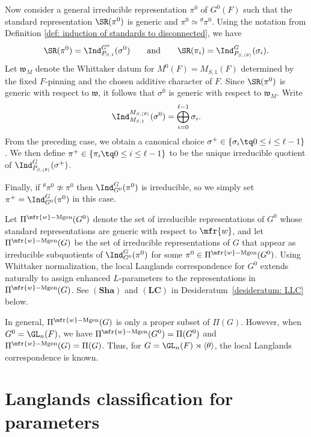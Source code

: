 \documentclass[11pt,letterpaper]{amsart}
\numberwithin{equation}{section}
\begin{document}
Now consider a general irreducible representation $\pi^0$ of $G^0(F)$ such that the standard representation $\SR(\pi^0)$ is generic and $\pi^0 \simeq {}^{\theta}\pi^0$. Using the notation from Definition \ref{def: induction of standards to disconnected}, we have
\[
\SR(\pi^0) = \Ind_{P_{{S},1}}^{G^0}(\sigma^0)
\qquad \text{and} \qquad
\SR(\pi_i) = \Ind_{P_{{S},\langle \theta\rangle}}^{G}(\sigma_i).
\]
 Let $\mathfrak{w}_M$ denote the Whittaker datum for $M^0(F) = M_{{S},1}(F)$ determined by the fixed $F$-pinning and the chosen additive character of $F$. Since $\SR(\pi^0)$ is generic with respect to $\mathfrak{w}$, it follows that $\sigma^0$ is generic with respect to $\mathfrak{w}_M$. Write 
\[\Ind_{M_{{S},1}}^{M_{{S}, \langle \theta \rangle}}(\sigma^0)= \bigoplus_{i=0}^{\ell -1} \sigma_{i}.\]
From the preceding case, we obtain a canonical choice $\sigma^+ \in \{\sigma_i \tq 0 \leq i \leq \ell-1\}$. We then define $\pi^+ \in \{\pi_i \tq 0 \leq i \leq \ell-1\}$ to be the unique irreducible quotient of $\Ind_{P_{{S},\langle \theta\rangle}}^{G}(\sigma^+)$.



Finally, if ${}^{\theta}{\pi^0} \not\simeq \pi^0$ then $\Ind_{G^0}^{G} (\pi^0)$ is irreducible, so we simply set $\pi^+ = \Ind_{G^0}^{G} (\pi^0)$ in this case.

\begin{remark}
Let $\Pi^{\mfr{w}-\textrm{Mgen}}(G^0)$ denote the set of irreducible representations of $G^0$ whose standard representations are generic with respect to $\mfr{w}$, and let $\Pi^{\mfr{w}-\textrm{Mgen}}(G)$ be the set of irreducible representations of $G$ that appear as irreducible subquotients of $\Ind_{G^0}^{G}(\pi^0)$ for some $\pi^0 \in \Pi^{\mfr{w}-\textrm{Mgen}}(G^0)$. 
Using Whittaker normalization, the local Langlands correspondence for $G^0$ extends naturally to assign enhanced $L$-parameters to the representations in $\Pi^{\mfr{w}-\textrm{Mgen}}(G)$. See $\mathbf{(Sha)}$ and $\mathbf{(LC)}$ in Desideratum~\ref{desideratum: LLC} below.


In general, $\Pi^{\mfr{w}-\textrm{Mgen}}(G)$ is only a proper subset of $\Pi(G)$. However, when $G^0 = \GL_n(F)$, we have $\Pi^{\mfr{w}-\textrm{Mgen}}(G^0) = \Pi(G^0)$ and $\Pi^{\mfr{w}-\textrm{Mgen}}(G) = \Pi(G)$. Thus, for $G = \GL_n(F) \rtimes \langle \theta \rangle$, the local Langlands correspondence is known.\end{remark}




\section{Langlands classification for parameters}\label{section: classification for parameters}
\end{document}
